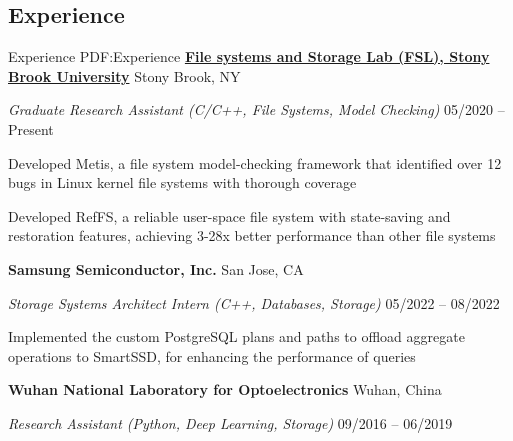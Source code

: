 \documentclass[a4paper,10pt,oneside]{article}
\begin{document}
\begin{body}
\section
{Experience}
{Experience}
{PDF:Experience}
\href{https://www.fsl.cs.stonybrook.edu/}
{{\textbf{File systems and Storage Lab (FSL), Stony Brook University}}}
\hfill
Stony Brook, NY

\emph{Graduate Research Assistant (C/C++, File Systems, Model Checking)}
\hfill
05/2020 --
Present

\GapNoBreak
\BulletItem
Developed Metis, a file system model-checking framework that identified over 12 bugs in Linux kernel file systems with thorough coverage 

\GapNoBreak
\BulletItem
Developed RefFS, a reliable user-space file system with state-saving and restoration features, achieving 3-28x better performance than other file systems 


\GapNoBreak

{\textbf{Samsung Semiconductor, Inc.}}
\hfill
San Jose, CA

\emph{Storage Systems Architect Intern (C++, Databases, Storage)}
\hfill
05/2022 --
08/2022

\GapNoBreak
\BulletItem
Implemented the custom PostgreSQL plans and paths to offload aggregate operations to SmartSSD, for enhancing the performance of queries





\GapNoBreak
{\textbf{Wuhan National Laboratory for Optoelectronics}}
\hfill
Wuhan, China

\emph{Research Assistant (Python, Deep Learning, Storage)}
\hfill
09/2016 --
06/2019


\end{body}
\end{document}
